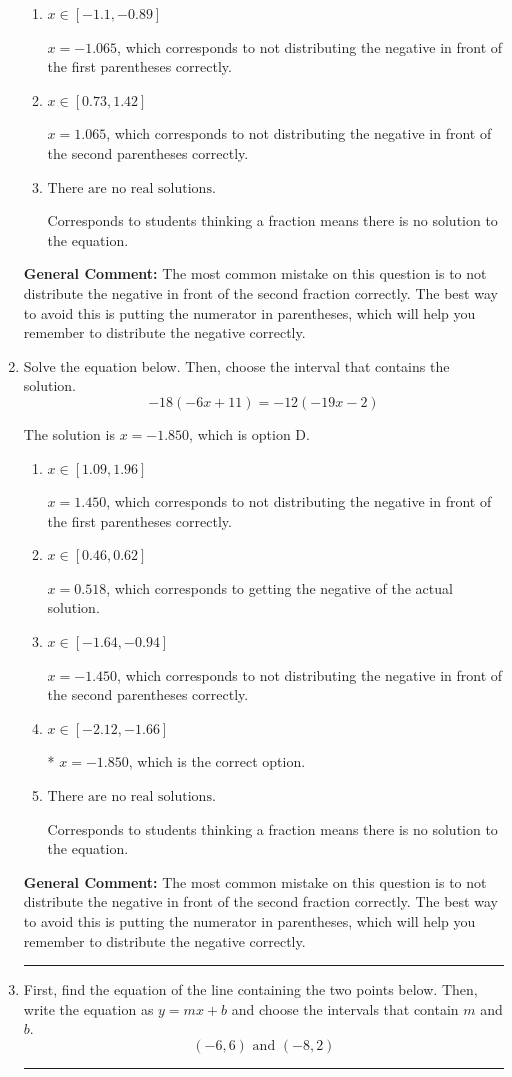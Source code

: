 \documentclass{extbook}[14pt]
\newcommand{\litem}[1]{\item #1

\rule{\textwidth}{0.4pt}}
\begin{document}
\begin{enumerate}
{\begin{enumerate}[label=\Alph*.]
* $x = 0.239$, which is the correct option.
\item \( x \in [-1.1, -0.89] \)

$x = -1.065$, which corresponds to not distributing the negative in front of the first parentheses correctly.
\item \( x \in [0.73, 1.42] \)

$x = 1.065$, which corresponds to not distributing the negative in front of the second parentheses correctly.
\item \( \text{There are no real solutions.} \)

Corresponds to students thinking a fraction means there is no solution to the equation.
\end{enumerate}

\textbf{General Comment:} The most common mistake on this question is to not distribute the negative in front of the second fraction correctly. The best way to avoid this is putting the numerator in parentheses, which will help you remember to distribute the negative correctly.
}
\litem{
Solve the equation below. Then, choose the interval that contains the solution.
\[ -18(-6x + 11) = -12(-19x -2) \]

The solution is \( x = -1.850 \), which is option D.\begin{enumerate}[label=\Alph*.]
\item \( x \in [1.09, 1.96] \)

$x = 1.450$, which corresponds to not distributing the negative in front of the first parentheses correctly.
\item \( x \in [0.46, 0.62] \)

$x = 0.518$, which corresponds to getting the negative of the actual solution.
\item \( x \in [-1.64, -0.94] \)

$x = -1.450$, which corresponds to not distributing the negative in front of the second parentheses correctly.
\item \( x \in [-2.12, -1.66] \)

* $x = -1.850$, which is the correct option.
\item \( \text{There are no real solutions.} \)

Corresponds to students thinking a fraction means there is no solution to the equation.
\end{enumerate}

\textbf{General Comment:} The most common mistake on this question is to not distribute the negative in front of the second fraction correctly. The best way to avoid this is putting the numerator in parentheses, which will help you remember to distribute the negative correctly.
}
\litem{
First, find the equation of the line containing the two points below. Then, write the equation as $ y=mx+b $ and choose the intervals that contain $m$ and $b$.
\[ (-6, 6) \text{ and } (-8, 2) \]

}
\end{enumerate}
\end{document}
